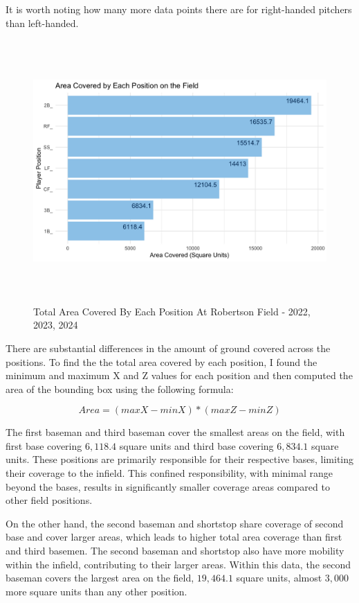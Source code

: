\documentclass{article}
\begin{document}
It is worth noting how many more data points there are for right-handed pitchers than left-handed. 

\newpage
\begin{figure}[h]
    \centering
    \includegraphics[height=10cm]{images/area_covered.png}
    \caption{Total Area Covered By Each Position At Robertson Field - 2022, 2023, 2024}
\end{figure}

There are substantial differences in the amount of ground covered across the positions. To find the the total area covered by each position, I found the minimum and maximum X and Z values for each position and then computed the area of the bounding box using the following formula: 

$$Area = (max X-minX)*(maxZ-minZ)$$

The first baseman and third baseman cover the smallest areas on the field, with first base covering $6,118.4$ square units and third base covering $6,834.1$ square units. These positions are primarily responsible for their respective bases, limiting their coverage to the infield. This confined responsibility, with minimal range beyond the bases, results in significantly smaller coverage areas compared to other field positions. 

On the other hand, the second baseman and shortstop share coverage of second base and cover larger areas, which leads to higher total area coverage than first and third basemen. The second baseman and shortstop also have more mobility within the infield, contributing to their larger areas. Within this data, the second baseman covers the largest area on the field, $19,464.1$ square units, almost $3,000$ more square units than any other position. 
\end{document}
